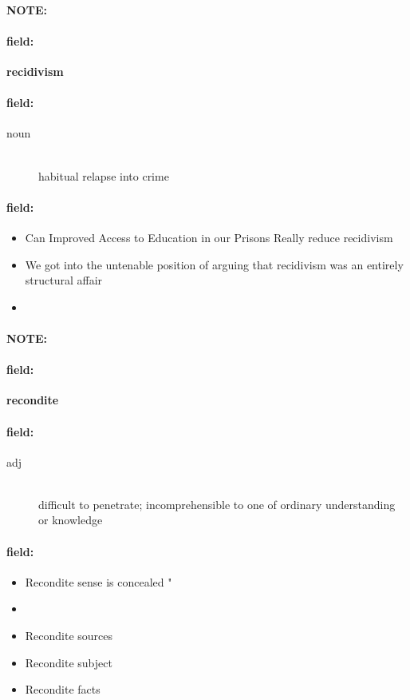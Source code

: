 \documentclass[12pt]{article}
\newenvironment{note}{\paragraph{NOTE:}}{}
\newenvironment{field}{\paragraph{field:}}{}
\begin{document}
\begin{note}
\begin{field}
\textbf{\large recidivism}
\end{field}


\begin{field}
\begin{description}
\item[noun] \hfill \\ 
habitual relapse into crime

\end{description}
\end{field}

\begin{field}
\begin{itemize}
\item Can Improved Access to Education in our Prisons Really reduce recidivism
\item We got into the untenable position of arguing that recidivism was an entirely structural affair
\item 
\end{itemize}
\end{field}
\end{note}
\begin{note}
\begin{field}
\textbf{\large recondite}
\end{field}


\begin{field}
\begin{description}
\item[adj] \hfill \\ 
difficult to penetrate; incomprehensible to one of ordinary understanding or knowledge

\end{description}
\end{field}

\begin{field}
\begin{itemize}
\item Recondite sense is concealed " 
\item 
\item Recondite sources
\item Recondite subject
\item Recondite facts
\end{itemize}
\end{field}
\end{note}
\end{document}
